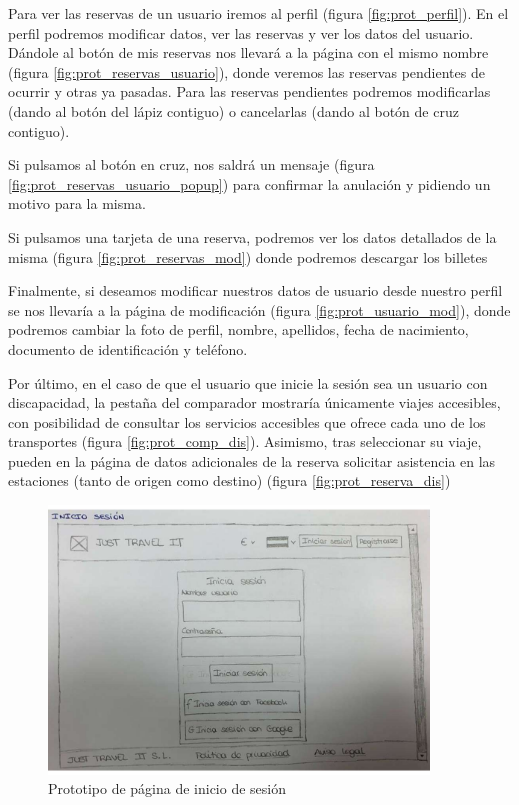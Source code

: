 Para ver las reservas de un usuario iremos al perfil (figura
\ref{fig:prot_perfil}). En el perfil podremos modificar datos, ver las reservas
y ver los datos del usuario. Dándole al botón de mis reservas nos llevará a la
página con el mismo nombre (figura \ref{fig:prot_reservas_usuario}), donde
veremos las reservas pendientes de ocurrir y otras ya pasadas. Para las
reservas pendientes podremos modificarlas (dando al botón del lápiz contiguo) o
cancelarlas (dando al botón de cruz contiguo).

Si pulsamos al botón en cruz, nos saldrá un mensaje (figura
\ref{fig:prot_reservas_usuario_popup}) para confirmar la anulación y pidiendo
un motivo para la misma.

Si pulsamos una tarjeta de una reserva, podremos ver los datos detallados de la
misma (figura \ref{fig:prot_reservas_mod}) donde podremos descargar los
billetes

Finalmente, si deseamos modificar nuestros datos de usuario desde nuestro
perfil se nos llevaría a la página de modificación (figura
\ref{fig:prot_usuario_mod}), donde podremos cambiar la foto de perfil, nombre,
apellidos, fecha de nacimiento, documento de identificación y teléfono.

Por último, en el caso de que el usuario que inicie la sesión sea un usuario con discapacidad, la pestaña del comparador mostraría únicamente viajes accesibles, con
posibilidad de consultar los servicios accesibles que ofrece cada uno de los transportes (figura \ref{fig:prot_comp_dis}). Asimismo, tras seleccionar su viaje, pueden 
en la página de datos adicionales de la reserva solicitar asistencia en las estaciones (tanto de origen como destino) (figura \ref{fig:prot_reserva_dis})

\begin{figure}[H]
    \centering
    \includegraphics[page=1, width=0.9\textwidth]{./Imagenes/Prototipo/Prototipos definitivos - Iteracion I.pdf}
    \caption{Prototipo de página de inicio de sesión}
    \label{fig:prot_ses}
\end{figure}

